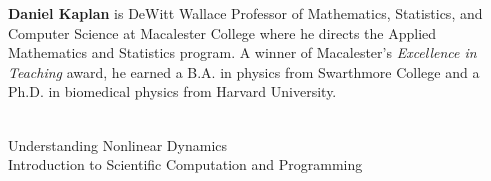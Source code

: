 {\bf Daniel Kaplan} is  DeWitt Wallace Professor of Mathematics, Statistics, and Computer Science at Macalester College where he directs the Applied Mathematics and Statistics program.  A winner of Macalester's {\em Excellence in Teaching} award, he earned a B.A. in physics from Swarthmore College and a Ph.D. in biomedical physics from Harvard University.

\\
Understanding Nonlinear Dynamics\\
Introduction to Scientific Computation and Programming


